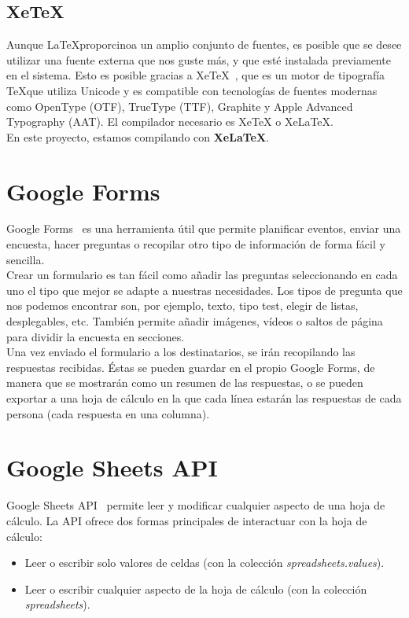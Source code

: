 \documentclass[a4paper, 12pt]{book}
\begin{document}
\subsection{XeTeX}
\label{xetex}
Aunque \LaTeX proporcinoa un amplio conjunto de fuentes, es posible que se desee utilizar una fuente externa que nos guste más, y que esté instalada previamente en el sistema. Esto es posible gracias a XeTeX~\cite{xetex:1}, que es un motor de tipografía \TeX que utiliza Unicode y es compatible con tecnologías de fuentes modernas como OpenType (OTF), TrueType (TTF), Graphite y Apple Advanced Typography (AAT). El compilador necesario es XeTeX o XeLaTeX.\\

En este proyecto, estamos compilando con \textbf{XeLaTeX}.



\section{Google Forms}
\label{sec:googleforms}
Google Forms~\cite{forms:1} es una herramienta útil que permite planificar eventos, enviar una encuesta, hacer preguntas o recopilar otro tipo de información de forma fácil y sencilla.\\

Crear un formulario es tan fácil como añadir las preguntas seleccionando en cada uno el tipo que mejor se adapte a nuestras necesidades. Los tipos de pregunta que nos podemos encontrar son, por ejemplo, texto, tipo test, elegir de listas, desplegables, etc. También permite añadir imágenes, vídeos o saltos de página para dividir la encuesta en secciones.\\

Una vez enviado el formulario a los destinatarios, se irán recopilando las respuestas recibidas. Éstas se pueden guardar en el propio Google Forms, de manera que se mostrarán como un resumen de las respuestas, o se pueden exportar a una hoja de cálculo en la que cada línea estarán las respuestas de cada persona (cada respuesta en una columna).


\section{Google Sheets API}
\label{sec:googlesheet}
Google Sheets API~\cite{sheet:1} permite leer y modificar cualquier aspecto de una hoja de cálculo. La API ofrece dos formas principales de interactuar con la hoja de cálculo:
\begin{itemize}
	\item Leer o escribir solo valores de celdas (con la colección \textit{spreadsheets.values}).
	\item Leer o escribir cualquier aspecto de la hoja de cálculo (con la colección \textit{spreadsheets}).
\end{itemize}
\end{document}
